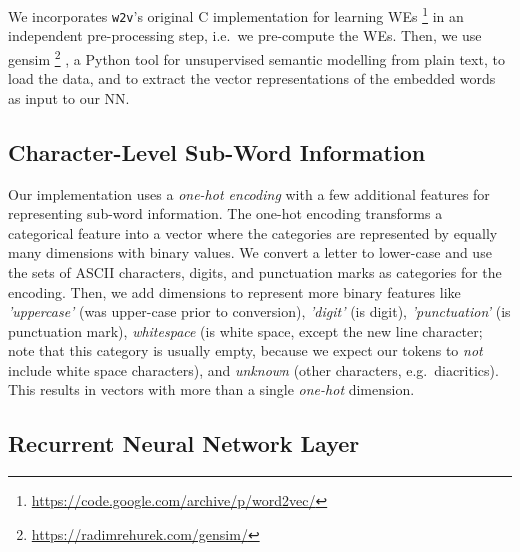 \documentclass[11pt]{article}
\newcommand\wtv{\texttt{w2v}\xspace}
\begin{document}
We incorporates \wtv's original C implementation for learning WEs%
\footnote{\url{https://code.google.com/archive/p/word2vec/}}
in an independent pre-processing step, i.e.~we pre-compute the WEs.
Then, we use gensim%
\footnote{\url{https://radimrehurek.com/gensim/}}%
, a Python tool for unsupervised semantic modelling from plain text, to load
the data, and to extract the vector representations of the embedded words as
input to our NN.


\subsection{Character-Level Sub-Word Information} %

Our implementation uses a \emph{one-hot encoding} with a few additional
features for representing sub-word information.
The one-hot encoding transforms a categorical feature into a vector where
the categories are represented by equally many dimensions with binary values.
We convert a letter to lower-case and use the sets of ASCII characters, digits,
and punctuation marks as categories for the encoding.
Then, we add dimensions to represent more binary features like
\emph{'uppercase'} (was upper-case prior to conversion), \emph{'digit'} (is
digit), \emph{'punctuation'} (is punctuation mark), \emph{whitespace} (is white
space, except the new line character; note that this category is usually empty,
because we expect our tokens to \emph{not} include white space characters), and
\emph{unknown} (other characters, e.g.~diacritics).
This results in vectors with more than a single \emph{one-hot} dimension. 
%

\subsection{Recurrent Neural Network Layer} %
\end{document}
